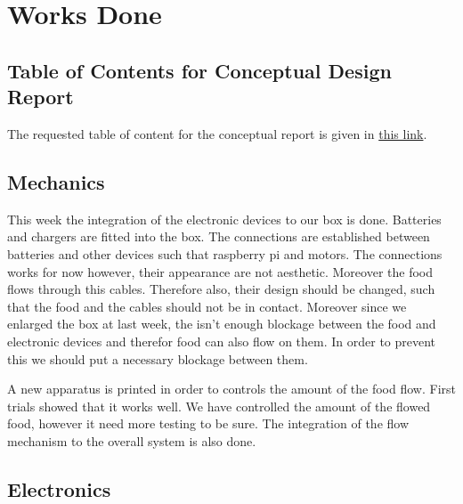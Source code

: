 \section{Works Done}
\label{sec:worksDone}

\subsection{Table of Contents for Conceptual Design Report}
The requested table of content for the conceptual report is given in {\color{blue} \href{https://github.com/afeser/FinalProject/tree/Report/src/Conceptual}{this link}}.

\subsection{Mechanics}

This week the integration of the electronic devices to our box is done. Batteries and chargers are fitted into the box. The connections are established between batteries and other devices such that raspberry pi and motors. The connections works for now however, their appearance are not aesthetic. Moreover the food flows through this cables. Therefore also, their design should be changed, such that the food and the cables should not be in contact. Moreover since we enlarged the box at last week, the isn't enough blockage between the food and electronic devices and therefor food can also flow on them. In order to prevent this we should put a necessary blockage between them.

A new apparatus is printed in order to controls the amount of the food flow. First trials showed that it works well. We have controlled the amount of the flowed food, however it need more testing to be sure. The integration of the flow mechanism to the overall system is also done.


\subsection{Electronics}

